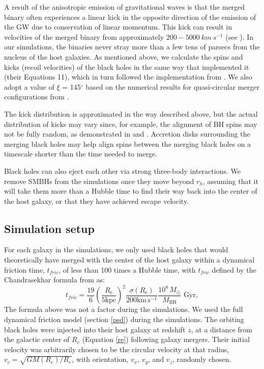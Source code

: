 \documentclass[fleqn,usenatbib,useAMS]{mnras}
\begin{document}
A result of the anisotropic emission of gravitational waves is that the merged binary often experiences a linear kick in the opposite direction of the emission of the GW due to conservation of linear momentum.  This kick can result in velocities of the merged binary from approximately $200-5000\ km\ s^{-1}$ (see \citealt{2007PhRvL..98w1101G, 2007PhRvL..98i1101G, 2007PhRvL..98w1102C, 2011PhRvL.107w1102L}).  In our simulations, the binaries never stray more than a few tens of parsecs from the nucleus of the host galaxies.  As mentioned above, we calculate the spins and kicks (recoil velocities) of the black holes in the same way that \citet{2015ApJ...799..178K} implemented it (their Equations 11), which in turn followed the implementation from \citet{2012PhRvD..85h4015L}.  We also adopt a value of $\xi$ = 145$^{\circ}$ based on the numerical results for quasi-circular merger configurations from \citet{2008PhRvD..77d4028L}.

The kick distribution is approximated in the way described above, but the actual distribution of kicks may vary since, for example, the alignment of BH spins may not be fully random, as demonstrated in \citet{2012PhRvD..85h4015L} and \citet{2010MNRAS.402..682D}. Accretion disks surrounding the merging black holes may help align spins between the merging black holes on a timescale shorter than the time needed to merge.

Black holes can also eject each other via strong three-body interactions. We remove SMBHs from the simulations once they move beyond $r_h$, assuming that it will take them more than a Hubble time to find their way back into the center of the host galaxy, or that they have achieved escape velocity.

\subsection{Simulation setup}\label{subsec:simset}
For each galaxy in the simulations, we only used black holes that would theoretically have merged with the center of the host galaxy within a dynamical friction time, $t_{fric}$, of less than 100 times a Hubble time, with $t_{fric}$ defined by the Chandrasekhar formula from \citet{2008gady.book.....B} as:
\begin{equation}\label{tfric}
    t_{fric} = \frac{19}{6}\left(\frac{R_\mathrm{e}}{5\mathrm{kpc}}\right)^2\frac{\sigma(R_\mathrm{e})}{200\mathrm{km}\,\mathrm{s}^{-1}}\frac{10^8\,M_{\odot}}{M_\mathrm{BH}} \text{  Gyr},
\end{equation}
The formula above was not a factor during the simulations.  We used the full dynamical friction model (section \ref{psd}) during the simulations.  The orbiting black holes were injected into their host galaxy at redshift $z$, at a distance from the galactic center of $R_{e}$ (Equation \ref{re}) following galaxy mergers.  Their initial velocity was arbitrarily chosen to be the circular velocity at that radius, $v_c = \sqrt{GM(R_e)/R_e}$, with orientation, $v_x$, $v_y$, and $v_z$, randomly chosen.
\end{document}
